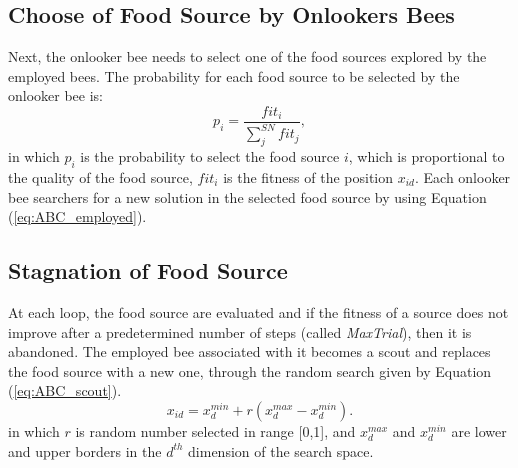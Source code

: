 \subsection{Choose of Food Source by Onlookers Bees}
Next, the onlooker bee needs to select one of the food sources explored by the employed bees. The probability for each food source to be selected by the onlooker bee is:
\begin{equation}\label{eq:ABC_probability}
p_i = \frac{fit_i}{\sum_{j}^{SN}fit_j},
\end{equation}
in which $p_i$ is the probability to select the food source $i$, which is proportional to the quality of the food source, $fit_i$ is the fitness of the position $x_{id}$. Each onlooker bee searchers for a new solution in the selected food source by using Equation (\ref{eq:ABC_employed}).

\subsection{Stagnation of Food Source}
At each loop, the food source are evaluated and if the fitness of a source does not improve after a predetermined number of steps (called \textit{MaxTrial}), then it is abandoned. The employed bee associated with it becomes a scout and replaces the food source with a new one, through the random search given by Equation (\ref{eq:ABC_scout}).
\begin{equation}\label{eq:ABC_scout}
x_{id} =  x_d^{min} + r(x_d^{max} - x_d^{min}).
\end{equation}
in which $r$ is random number selected in range [0,1], and $x_d^{max}$ and $x_d^{min}$ are lower and upper borders in the $d^{th}$ dimension of the search space.

